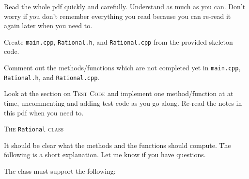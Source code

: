 \begin{tightlist}
  \item Read the whole pdf quickly and carefully. Understand as much as
  you can. Don't worry if you don't remember everything you read
  because you can re-read it again later when you need to.
  \item Create \verb!main.cpp!, \verb!Rational.h!, and \verb!Rational.cpp!
  from the provided skeleton code.
  \item Comment out the methods/functions which are
  not completed yet in
  \verb!main.cpp!, \verb!Rational.h!, and \verb!Rational.cpp!.
  \item Look at the section on \textsc{Test Code} and implement
    one method/function at at time, uncommenting and adding test code
    as you go along. Re-read the notes in this pdf when you need to.
\end{tightlist}



\newpage
\textsc{The} \texttt{Rational} \textsc{class}

It should be clear what the methods and the functions should compute.
The following
is a short explanation. Let me know if you have questions.

The class must support the following:

